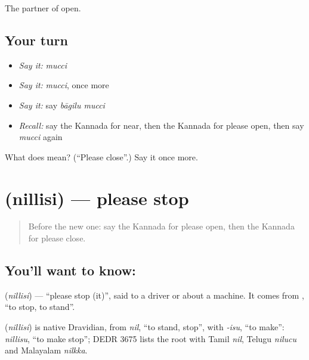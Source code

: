 \begin{grammarlens}[title={What you've built}]
The partner of open.
\end{grammarlens}

\subsection*{Your turn}
\begin{itemize}
\raggedright
  \item \emph{Say it:} \emph{mucci}
  \item \emph{Say it:} \emph{mucci}, once more
  \item \emph{Say it:} say \emph{bāgilu mucci}
  \item \emph{Recall:} say the Kannada for near, then the Kannada for please open, then say \emph{mucci} again
\end{itemize}

\begin{tcolorbox}[breakable,colback=teal!4,colframe=teal!35!black,title={Before you move on}]
What does  mean? (\textquotedblleft{}Please close\textquotedblright{}.) Say it once more.
\end{tcolorbox}
\section[\texorpdfstring{\kn{ನಿಲ್ಲಿಸಿ} (nillisi)}{ನಿಲ್ಲಿಸಿ (nillisi)}]{ (nillisi) — please stop}

\label{lesson:KA-C101-stop}



\begin{quote}
Before the new one: say the Kannada for please open, then the Kannada for please close.
\end{quote}

\subsection*{You'll want to know: }
\textbf{} (\emph{nillisi}) — \textquotedblleft{}please stop (it)\textquotedblright{}, said to a driver or about a machine. It comes from \textbf{}, \textquotedblleft{}to stop, to stand\textquotedblright{}.

\begin{cousinweb}
\textbf{} (\emph{nillisi}) is native Dravidian, from \emph{nil}, \textquotedblleft{}to stand, stop\textquotedblright{}, with \emph{-isu}, \textquotedblleft{}to make\textquotedblright{}: \emph{nillisu}, \textquotedblleft{}to make stop\textquotedblright{}; DEDR 3675 lists the root with Tamil \emph{nil}, Telugu \emph{nilucu} and Malayalam \emph{nilkka}.
\end{cousinweb}

